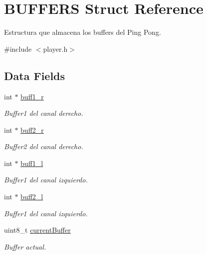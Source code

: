 \hypertarget{struct_b_u_f_f_e_r_s}{}\section{B\+U\+F\+F\+E\+RS Struct Reference}
\label{struct_b_u_f_f_e_r_s}


Estructura que almacena los buffers del Ping Pong.  




{\ttfamily \#include $<$player.\+h$>$}

\subsection*{Data Fields}
\begin{DoxyCompactItemize}
\item 
int $\ast$ \mbox{\hyperlink{struct_b_u_f_f_e_r_s_ad31aa70b56496218b2a23ff3515a1cd6}{buff1\+\_\+r}}
\begin{DoxyCompactList}\small\item\em Buffer1 del canal derecho. \end{DoxyCompactList}\item 
int $\ast$ \mbox{\hyperlink{struct_b_u_f_f_e_r_s_a41f147f529b8c09dd8287a029d373b44}{buff2\+\_\+r}}
\begin{DoxyCompactList}\small\item\em Buffer2 del canal derecho. \end{DoxyCompactList}\item 
int $\ast$ \mbox{\hyperlink{struct_b_u_f_f_e_r_s_a39eefabe09b3b120d69fbaa4b6b005ce}{buff1\+\_\+l}}
\begin{DoxyCompactList}\small\item\em Buffer1 del canal izquierdo. \end{DoxyCompactList}\item 
int $\ast$ \mbox{\hyperlink{struct_b_u_f_f_e_r_s_a4b72ec787f878bb4946eb99959a9eee1}{buff2\+\_\+l}}
\begin{DoxyCompactList}\small\item\em Buffer1 del canal izquierdo. \end{DoxyCompactList}\item 
uint8\+\_\+t \mbox{\hyperlink{struct_b_u_f_f_e_r_s_a6559ce1afae303f5a6024afba9dbea8b}{current\+Buffer}}
\begin{DoxyCompactList}\small\item\em Buffer actual. \end{DoxyCompactList}\item 

\end{DoxyCompactItemize}

